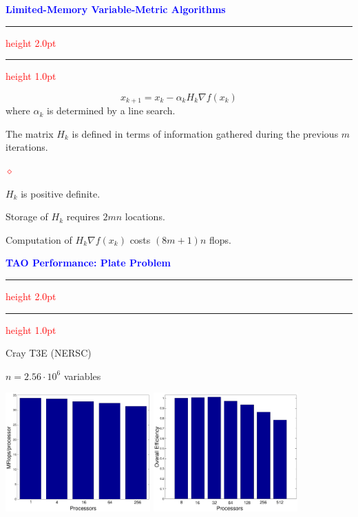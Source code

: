 \documentclass{seminar}
\newcommand{\grad}{\nabla}
\newcommand{\reddiamond}{\textcolor{red}{$\diamond$}}
\newcommand{\redstripe}{\textcolor{red}{\hrule height 2.0pt\hfil}
             \vspace{-1.8pt}
             \textcolor{red}{\hrule height 1.0pt\hfil}
}
\newcommand{\heading}[1]{%
   \centerline{\textcolor{blue}{\textbf{#1}}}%
    \redstripe%
    \bigskip
}
\begin{document}
\begin{slide}

\heading{Limited-Memory Variable-Metric Algorithms}

\[
x_{k+1} = x_k - \alpha_k H_k \grad f (x_k )
\]
where $ \alpha_k $ is determined by a line search.

\medskip 

The matrix $ H_k $ is defined in terms
of information gathered during the
previous $m$ iterations.

\medskip

\begin{list}{\reddiamond}{}
\item
$ H_k $ is positive definite.
\item
Storage of $ H_k $ requires $ 2 m n $ locations.
\item
Computation of $ H_k \grad f (x_k) $ costs
$ (8m+1) n $ flops.
\end{list}

\vfill

\end{slide}


\begin{slide}

\heading{TAO Performance: Plate Problem}

\begin{center}
Cray T3E (NERSC)

$ n = 2.56 \cdot 10^6 $ variables
\end{center}

\bigskip

\centerline {\includegraphics[height=1.8in]{../images/f3}
              \includegraphics[height=1.8in]{../images/f4}}
\vfill

\end{slide}
\end{document}
